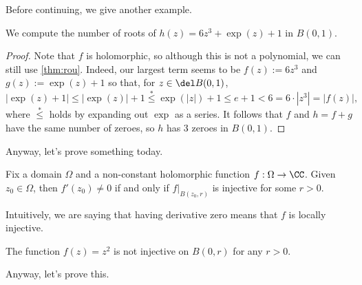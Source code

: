 Before continuing, we give another example.
\begin{exe}
	We compute the number of roots of $h(z)=6z^3+\exp(z)+1$ in $B(0,1)$.
\end{exe}
\begin{proof}
	Note that $f$ is holomorphic, so although this is not a polynomial, we can still use \autoref{thm:rou}. Indeed, our largest term seems to be $f(z):=6z^3$ and $g(z):=\exp(z)+1$ so that, for $z\in\del B(0,1)$,
	\[|\exp(z)+1|\le|\exp(z)|+1\stackrel*\le\exp(|z|)+1\le e+1<6=6\cdot\left|z^3\right|=|f(z)|,\]
	where $\stackrel*\le$ holds by expanding out $\exp$ as a series. It follows that $f$ and $h=f+g$ have the same number of zeroes, so $h$ has $\boxed3$ zeroes in $B(0,1)$.
\end{proof}
Anyway, let's prove something today.
\begin{proposition} \label{prop:locallyinjective}
	Fix a domain $\Omega$ and a non-constant holomorphic function $f:\Omega\to\CC$. Given $z_0\in\Omega$, then $f'(z_0)\ne0$ if and only if $f|_{B(z_0,r)}$ is injective for some $r>0$.
\end{proposition}
Intuitively, we are saying that having derivative zero means that $f$ is locally injective.
\begin{ex}
	The function $f(z)=z^2$ is not injective on $B(0,r)$ for any $r>0$.
\end{ex}
Anyway, let's prove this.
